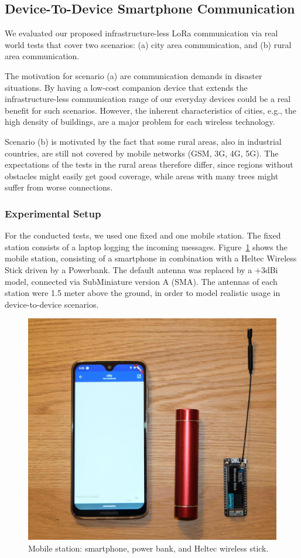 \subsection{Device-To-Device Smartphone Communication}
We evaluated our proposed infrastructure-less LoRa communication via real world tests that cover two scenarios: (a) city area communication, and (b) rural area communication.

The motivation for scenario (a) are communication demands in disaster situations.
By having a low-cost companion device that extends the infrastructure-less communication range of our everyday devices could be a real benefit for such scenarios.
However, the inherent characteristics of cities, e.g., the high density of buildings, are a major problem for each wireless technology.

Scenario (b) is motivated by the fact that some rural areas, also in industrial countries, are still not covered by mobile networks (GSM, 3G, 4G, 5G).
The expectations of the tests in the rural areas therefore differ, since regions without obstacles might easily get good coverage, while areas with many trees might suffer from worse connections.

\subsubsection{Experimental Setup}

For the conducted tests, we used one fixed and one mobile station. 
The fixed station consists of a laptop logging the incoming messages. 
Figure~\ref{hoechst2020lora:fig:evalsetup1} shows the mobile station, consisting of a smartphone in combination with a Heltec Wireless Stick driven by a Powerbank.
The default antenna was replaced by a +3dBi model, connected via SubMiniature version A (SMA).
The antennas of each station were 1.5 meter above the ground, in order to model realistic usage in device-to-device scenarios.

\begin{figure}[ht!]
    \centering
    \includegraphics[width=.7\textwidth]{gfx/bluera-package.jpg}
    \caption{Mobile station: smartphone, power bank, and Heltec wireless stick.}
    \label{hoechst2020lora:fig:evalsetup1}
\end{figure}

